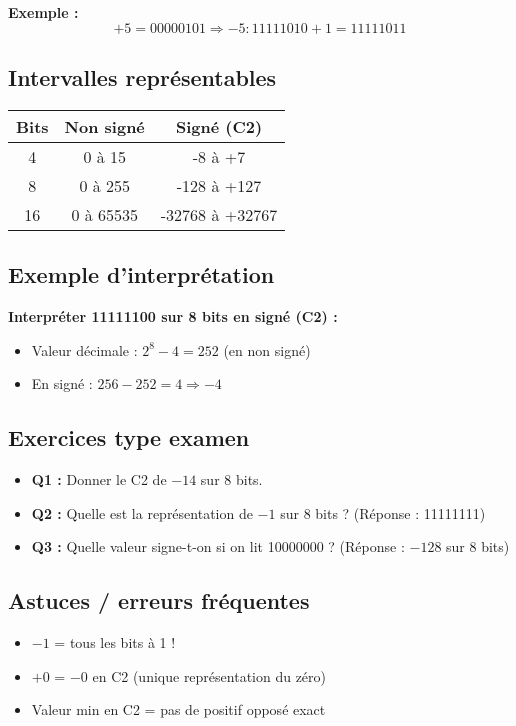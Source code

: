\documentclass[12pt,a4paper]{article}
\begin{document}
\textbf{Exemple :}
\[ +5 = 00000101 \Rightarrow -5 : 11111010 + 1 = 11111011 \]

\subsection{Intervalles représentables}
\begin{tabular}{|c|c|c|}
\hline
Bits & Non signé & Signé (C2) \\
\hline
4 & 0 à 15 & -8 à +7 \\
8 & 0 à 255 & -128 à +127 \\
16 & 0 à 65535 & -32768 à +32767 \\
\hline
\end{tabular}

\subsection{Exemple d'interprétation}
\textbf{Interpréter 11111100 sur 8 bits en signé (C2) :}
\begin{itemize}
  \item Valeur décimale : $2^8 - 4 = 252$ (en non signé)
  \item En signé : $256 - 252 = 4 \Rightarrow -4$
\end{itemize}

\subsection{Exercices type examen}
\begin{itemize}
  \item \textbf{Q1 :} Donner le C2 de $-14$ sur 8 bits.
  \item \textbf{Q2 :} Quelle est la représentation de $-1$ sur 8 bits ? (Réponse : 11111111)
  \item \textbf{Q3 :} Quelle valeur signe-t-on si on lit 10000000 ? (Réponse : $-128$ sur 8 bits)
\end{itemize}

\subsection{Astuces / erreurs fréquentes}
\begin{itemize}
  \item $-1$ = tous les bits à 1 !
  \item $+0$ = $-0$ en C2 (unique représentation du zéro)
  \item Valeur min en C2 = pas de positif opposé exact
\end{itemize}
\end{document}
